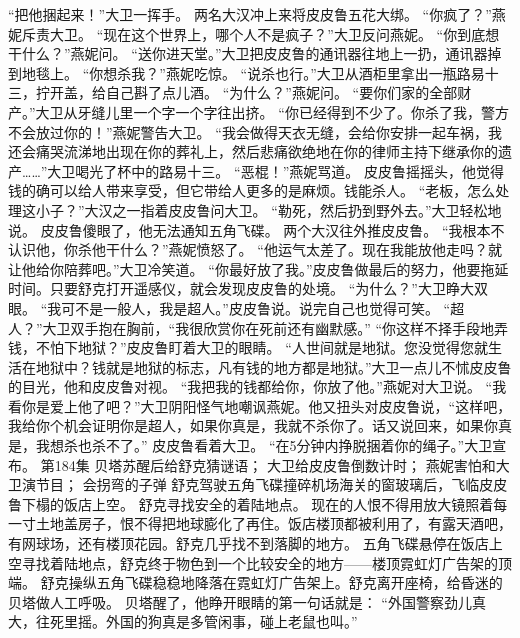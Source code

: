 \documentclass[a4paper,12pt,UTF8,twoside]{ctexbook}
\begin{document}
        “把他捆起来！”大卫一挥手。 
        两名大汉冲上来将皮皮鲁五花大绑。 
        “你疯了？”燕妮斥责大卫。 
        “现在这个世界上，哪个人不是疯子？”大卫反问燕妮。 
        “你到底想干什么？”燕妮问。 
        “送你进天堂。”大卫把皮皮鲁的通讯器往地上一扔，通讯器掉到地毯上。 
        “你想杀我？”燕妮吃惊。 
        “说杀也行。”大卫从酒柜里拿出一瓶路易十三，拧开盖，给自己斟了点儿酒。 
        “为什么？”燕妮问。 
        “要你们家的全部财产。”大卫从牙缝儿里一个字一个字往出挤。 
        “你已经得到不少了。你杀了我，警方不会放过你的！”燕妮警告大卫。 
        “我会做得天衣无缝，会给你安排一起车祸，我还会痛哭流涕地出现在你的葬礼上，然后悲痛欲绝地在你的律师主持下继承你的遗产……”大卫喝光了杯中的路易十三。 
        “恶棍！”燕妮骂道。 
        皮皮鲁摇摇头，他觉得钱的确可以给人带来享受，但它带给人更多的是麻烦。钱能杀人。 
        “老板，怎么处理这小子？”大汉之一指着皮皮鲁问大卫。 
        “勒死，然后扔到野外去。”大卫轻松地说。 
        皮皮鲁傻眼了，他无法通知五角飞碟。 
        两个大汉往外推皮皮鲁。 
        “我根本不认识他，你杀他干什么？”燕妮愤怒了。 
        “他运气太差了。现在我能放他走吗？就让他给你陪葬吧。”大卫冷笑道。 
        “你最好放了我。”皮皮鲁做最后的努力，他要拖延时间。只要舒克打开遥感仪，就会发现皮皮鲁的处境。 
        “为什么？”大卫睁大双眼。 
        “我可不是一般人，我是超人。”皮皮鲁说。说完自己也觉得可笑。 
        “超人？”大卫双手抱在胸前，“我很欣赏你在死前还有幽默感。” 
        “你这样不择手段地弄钱，不怕下地狱？”皮皮鲁盯着大卫的眼睛。 
        “人世间就是地狱。您没觉得您就生活在地狱中？钱就是地狱的标志，凡有钱的地方都是地狱。”大卫一点儿不怵皮皮鲁的目光，他和皮皮鲁对视。 
        “我把我的钱都给你，你放了他。”燕妮对大卫说。 
        “我看你是爱上他了吧？”大卫阴阳怪气地嘲讽燕妮。他又扭头对皮皮鲁说，“这样吧，我给你个机会证明你是超人，如果你真是，我就不杀你了。话又说回来，如果你真是，我想杀也杀不了。” 
        皮皮鲁看着大卫。 
      “在5分钟内挣脱捆着你的绳子。”大卫宣布。   第184集 
        贝塔苏醒后给舒克猜谜语； 
        大卫给皮皮鲁倒数计时； 
        燕妮害怕和大卫演节目； 
        会拐弯的子弹   
        舒克驾驶五角飞碟撞碎机场海关的窗玻璃后，飞临皮皮鲁下榻的饭店上空。 
        舒克寻找安全的着陆地点。 
        现在的人恨不得用放大镜照着每一寸土地盖房子，恨不得把地球膨化了再住。饭店楼顶都被利用了，有露天酒吧，有网球场，还有楼顶花园。舒克几乎找不到落脚的地方。 
        五角飞碟悬停在饭店上空寻找着陆地点，舒克终于物色到一个比较安全的地方——楼顶霓虹灯广告架的顶端。 
        舒克操纵五角飞碟稳稳地降落在霓虹灯广告架上。舒克离开座椅，给昏迷的贝塔做人工呼吸。 
        贝塔醒了，他睁开眼睛的第一句话就是： 
        “外国警察劲儿真大，往死里摇。外国的狗真是多管闲事，碰上老鼠也叫。” 
\end{document}
